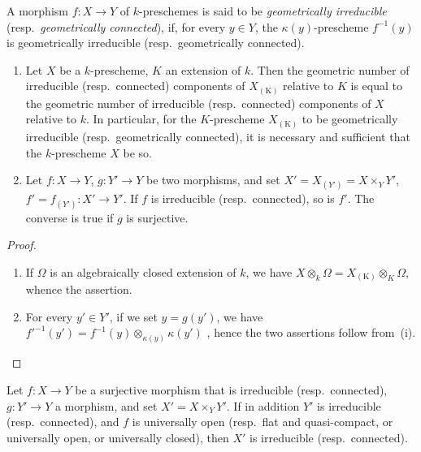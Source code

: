 
\begin{definition}[4.5.5]
\label{IV.4.5.5}
A morphism $f:X\to Y$ of $k$-preschemes is said to be \emph{geometrically irreducible} (resp.\ \emph{geometrically connected}), if, for every $y\in Y$, the $\kappa(y)$-prescheme $f^{-1}(y)$ is geometrically irreducible (resp.\ geometrically connected).
\end{definition}

\begin{proposition}[4.5.6]
\label{IV.4.5.6}
\begin{enumerate}[label=(\roman*)]
  \item Let $X$ be a $k$-prescheme, $K$ an extension of $k$.
Then the geometric number of irreducible (resp.\ connected) components of $X_{(\mathrm{K})}$ relative to $K$ is equal to the geometric number of irreducible (resp.\ connected) components of $X$ relative to $k$.
In particular, for the $K$-prescheme $X_{(\mathrm{K})}$ to be geometrically irreducible (resp.\ geometrically connected), it is necessary and sufficient that the $k$-prescheme $X$ be so.
  \item Let $f:X\to Y$, $g:Y'\to Y$ be two morphisms, and set $X'=X_{(Y')}=X\times_Y Y'$, $f'=f_{(Y')}:X'\to Y'$.
If $f$ is irreducible (resp.\ connected), so is $f'$.
The converse is true if $g$ is surjective.
\end{enumerate}
\end{proposition}

\begin{proof}
\begin{enumerate}[label=(\roman*)]
  \item If $\Omega$ is an algebraically closed extension of $k$, we have $X\otimes_k\Omega=X_{(\mathrm{K})}\otimes_K\Omega$, whence the assertion.
  \item For every $y'\in Y'$, if we set $y=g(y')$, we have $f'^{-1}(y')=f^{-1}(y)\otimes_{\kappa(y)}\kappa(y')$ , hence the two assertions follow from~(i).
\end{enumerate}
\end{proof}

\begin{proposition}[4.5.7]
\label{IV.4.5.7}
Let $f:X\to Y$ be a surjective morphism that is irreducible (resp.\ connected), $g:Y'\to Y$ a morphism, and set $X'=X\times_Y Y'$.
If in addition $Y'$ is irreducible (resp.\ connected), and $f$ is universally open (resp.\ flat and quasi-compact, or universally open, or universally closed), then $X'$ is irreducible (resp.\ connected).
\end{proposition}

